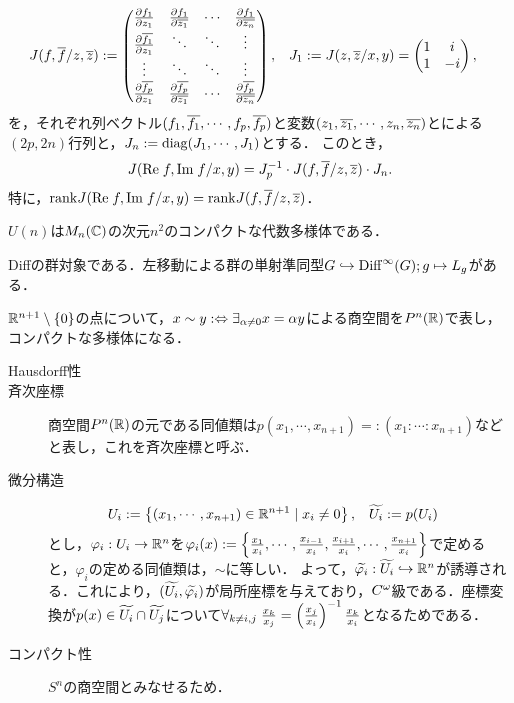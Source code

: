 \documentclass[uplatex,dvipdfmx]{jsreport}
\begin{document}
\begin{proposition}[複素Jacobi行列]
    \begin{align*}
        J(f,\overline{f}/z,\overline{z})&:=\begin{pmatrix}\frac{\partial f_1}{\partial z_1}&\frac{\partial f_1}{\partial \overline{z_1}}&\cdots&\frac{\partial f_1}{\partial \overline{z_n}}\\\frac{\partial \overline{f_1}}{\partial z_1}&\ddots&\ddots&\vdots\\\vdots&\ddots&\ddots&\vdots\\\frac{\partial \overline{f_p}}{\partial z_1}&\frac{\partial \overline{f_p}}{\partial \overline{z_1}}&\cdots&\frac{\partial \overline{f_p}}{\partial \overline{z_n}}\end{pmatrix},&J_1&:=J(z,\overline{z}/x,y)=\begin{pmatrix}1&i\\1&-i\end{pmatrix},
    \end{align*}
    を，それぞれ列ベクトル$(f_1,\overline{f_1},\cdots,f_p,\overline{f_p})$と変数$(z_1,\overline{z_1},\cdots,z_n,\overline{z_n})$とによる$(2p,2n)$行列と，$J_n:=\mathrm{diag}(J_1,\cdots,J_1)$とする．
    このとき，
    \[J(\mathrm{Re}\; f,\mathrm{Im}\; f/x,y)=J^{-1}_p\cdot J(f,\overline{f}/z,\overline{z})\cdot J_n.\]
    特に，$\mathrm{rank} J(\mathrm{Re}\; f,\mathrm{Im}\; f/x,y)=\mathrm{rank} J(f,\overline{f}/z,\overline{z})$．
\end{proposition}

\begin{example}[複素空間中の代数多様体$U$]
    $U(n)$は$M_n(\mathbb{C})$の次元$n^2$のコンパクトな代数多様体である．
\end{example}

\begin{example}[Lie群]
    Diffの群対象である．左移動による群の単射準同型$G\hookrightarrow\mathrm{Diff}^\infty(G);g\mapsto L_g$がある．
\end{example}

\begin{example}[射影空間]
    $\mathbb{R}^{n+1}\setminus\{0\}$の点について，$x\sim y:\Leftrightarrow\exists_{\alpha\ne0}x=\alpha y$による商空間を$P^n(\mathbb{R})$で表し，コンパクトな多様体になる．
    \begin{description}
        \item[Hausdorff性] 
        \item[斉次座標] 商空間$P^n(\mathbb{R})$の元である同値類は$p(x_1,\cdots,x_{n+1})=:(x_1:\cdots:x_{n+1})$などと表し，これを斉次座標と呼ぶ．
        \item[微分構造] \begin{align*}
            U_i&:=\left\{(x_1,\cdots,x_{n+1})\in\mathbb{R}^{n+1}\mid x_i\ne 0\right\},&\widetilde{U_i}&:=p(U_i)
        \end{align*}
        とし，$\varphi_i:U_i\to\mathbb{R}^n$を$\varphi_i(x):=\left\{\frac{x_1}{x_i},\cdots,\frac{x_{i-1}}{x_i},\frac{x_{i+1}}{x_i},\cdots,\frac{x_{n+1}}{x_i}\right\}$で定めると，$\varphi_i$の定める同値類は，$\sim$に等しい．
        よって，$\widetilde{\varphi_i}:\widetilde{U_i}\hookrightarrow\mathbb{R}^{n}$が誘導される．これにより，$(\widetilde{U_i},\widetilde{\varphi_i})$が局所座標を与えており，$C^\omega$級である．座標変換が$p(x)\in\widetilde{U_i}\cap\widetilde{U_j}$について$\forall_{k\ne i,j}\;\frac{x_k}{x_j}=\left(\frac{x_j}{x_i}\right)^{-1}\frac{x_k}{x_i}$となるためである．
        \item[コンパクト性] $S^n$の商空間とみなせるため．
    \end{description}
\end{example}
\end{document}
